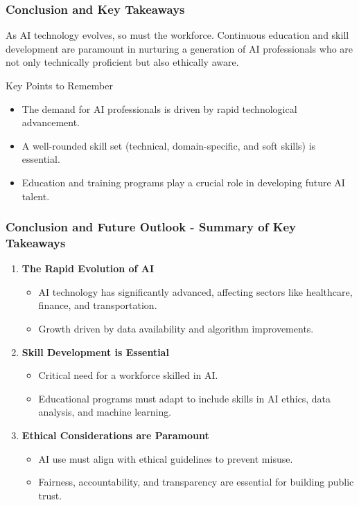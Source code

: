\documentclass{beamer}
\begin{document}
\begin{frame}[fragile]
    \frametitle{Conclusion and Key Takeaways}
    As AI technology evolves, so must the workforce. Continuous education and skill development are paramount in nurturing a generation of AI professionals who are not only technically proficient but also ethically aware.

    \begin{block}{Key Points to Remember}
        \begin{itemize}
            \item The demand for AI professionals is driven by rapid technological advancement.
            \item A well-rounded skill set (technical, domain-specific, and soft skills) is essential.
            \item Education and training programs play a crucial role in developing future AI talent.
        \end{itemize}
    \end{block}
\end{frame}

\begin{frame}[fragile]
    \frametitle{Conclusion and Future Outlook - Summary of Key Takeaways}

    \begin{enumerate}
        \item \textbf{The Rapid Evolution of AI}
        \begin{itemize}
            \item AI technology has significantly advanced, affecting sectors like healthcare, finance, and transportation.
            \item Growth driven by data availability and algorithm improvements.
        \end{itemize}

        \item \textbf{Skill Development is Essential}
        \begin{itemize}
            \item Critical need for a workforce skilled in AI.
            \item Educational programs must adapt to include skills in AI ethics, data analysis, and machine learning.
        \end{itemize}

        \item \textbf{Ethical Considerations are Paramount}
        \begin{itemize}
            \item AI use must align with ethical guidelines to prevent misuse.
            \item Fairness, accountability, and transparency are essential for building public trust.
        \end{itemize}
    \end{enumerate}
\end{frame}
\end{document}
